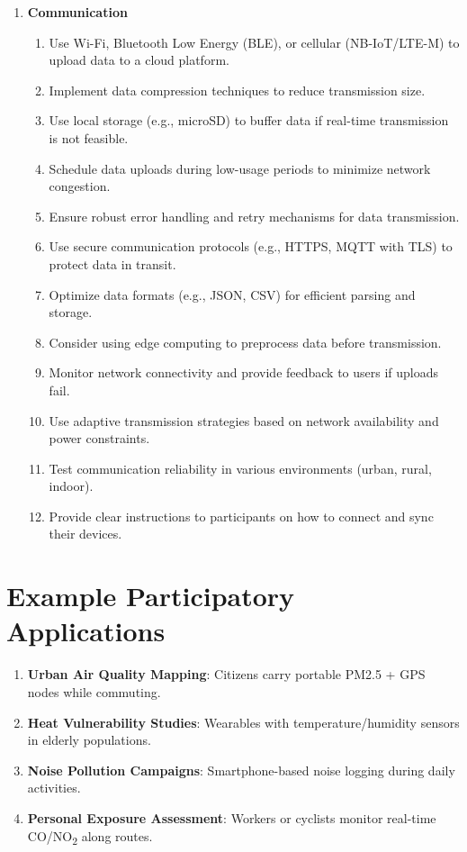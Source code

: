 \documentclass[12pt,a4paper]{article}
\begin{document}
\begin{enumerate}
    \item \textbf{Communication}
          \begin{enumerate}
              \item Use Wi-Fi, Bluetooth Low Energy (BLE), or cellular (NB-IoT/LTE-M) to upload data to a cloud platform.
              \item Implement data compression techniques to reduce transmission size.
              \item Use local storage (e.g., microSD) to buffer data if real-time transmission is not feasible.
              \item Schedule data uploads during low-usage periods to minimize network congestion.
              \item Ensure robust error handling and retry mechanisms for data transmission.
              \item Use secure communication protocols (e.g., HTTPS, MQTT with TLS) to protect data in transit.
              \item Optimize data formats (e.g., JSON, CSV) for efficient parsing and storage.
              \item Consider using edge computing to preprocess data before transmission.
              \item Monitor network connectivity and provide feedback to users if uploads fail.
              \item Use adaptive transmission strategies based on network availability and power constraints.
              \item Test communication reliability in various environments (urban, rural, indoor).
              \item Provide clear instructions to participants on how to connect and sync their devices.
          \end{enumerate}
\end{enumerate}

\section*{Example Participatory Applications}

\begin{enumerate}
    \item \textbf{Urban Air Quality Mapping}: Citizens carry portable PM2.5 + GPS nodes while commuting.
    \item \textbf{Heat Vulnerability Studies}: Wearables with temperature/humidity sensors in elderly populations.
    \item \textbf{Noise Pollution Campaigns}: Smartphone-based noise logging during daily activities.
    \item \textbf{Personal Exposure Assessment}: Workers or cyclists monitor real-time CO/NO\textsubscript{2} along routes.
\end{enumerate}
\end{document}
